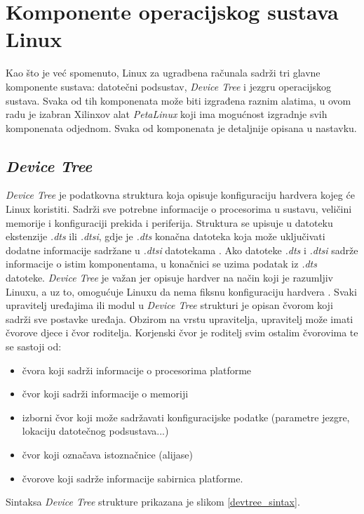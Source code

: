 \documentclass[times, utf8, diplomski, numeric]{fer}
\begin{document}
\section{Komponente operacijskog sustava Linux}
Kao što je već spomenuto, Linux za ugradbena računala sadrži tri glavne komponente sustava: datotečni podsustav, \textit{Device
Tree} i jezgru operacijskog sustava. Svaka od tih komponenata može biti izgrađena raznim alatima, u ovom radu je izabran
Xilinxov alat \textit{PetaLinux} koji ima mogućnost izgradnje svih komponenata odjednom. Svaka od komponenata je detaljnije
opisana u nastavku.

\subsection{\textit{Device Tree}}
\textit{Device Tree} je podatkovna struktura koja opisuje konfiguraciju hardvera kojeg će Linux koristiti. Sadrži sve potrebne
informacije o procesorima u sustavu, veličini memorije i konfiguraciji prekida i periferija. Struktura se upisuje u datoteku
ekstenzije \textit{.dts} ili \textit{.dtsi}, gdje je \textit{.dts} konačna datoteka koja može uključivati dodatne informacije
sadržane u \textit{.dtsi} datotekama \cite{xlnx}. Ako datoteke \textit{.dts} i \textit{.dtsi} sadrže informacije o istim komponentama,
u konačnici se uzima podatak iz \textit{.dts} datoteke. \textit{Device Tree} je važan jer opisuje hardver na način koji je
razumljiv Linuxu, a uz to, omogućuje Linuxu da nema fiksnu konfiguraciju hardvera \cite{plnx}. Svaki upravitelj uređajima ili modul
u \textit{Device Tree} strukturi je opisan čvorom koji sadrži sve postavke uređaja. Obzirom na vrstu upravitelja, upravitelj
može imati čvorove djece i čvor roditelja. Korjenski čvor je roditelj svim ostalim čvorovima te se sastoji od:
\begin{itemize}
  \item{čvora koji sadrži informacije o procesorima platforme}
  \item{čvor koji sadrži informacije o memoriji}
  \item{izborni čvor koji može sadržavati konfiguracijske podatke (parametre jezgre, lokaciju datotečnog podsustava...)}
  \item{čvor koji označava istoznačnice (alijase)}
  \item{čvorove koji sadrže informacije sabirnica platforme.}
\end{itemize}
Sintaksa \textit{Device Tree} strukture prikazana je slikom \ref{devtree_sintax}.
\end{document}
